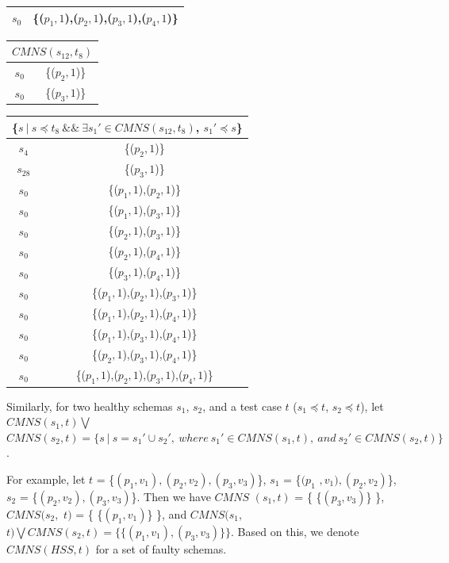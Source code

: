 {\begin{table}[htbp]
\begin{tabular}{|c|c|}
   $s_{0}$ & \{($p_{1}, 1$),($p_{2}, 1$),($p_{3}, 1$),($p_{4}, 1$)\} \\
   \hline
    \end{tabular}%
\quad
    \begin{tabular}{|c|c|} \hline
     \multicolumn{2}{|c|}{$CMNS(s_{12}, t_{8})$} \\ \hline
   $s_{0}$ & \{($p_{2}, 1$)\} \\
   $s_{0}$ & \{($p_{3}, 1$)\} \\
    \hline
    \end{tabular}%
\quad
    \begin{tabular}{|c|c|} \hline
   \multicolumn{2}{|c|}{\{$ s\ |\ s \preceq t_{8}\ \&\& \ \exists s_{1}' \in CMNS(s_{12}, t_{8})$, $s_{1}' \preceq s$\}}\\ \hline
   $s_{4}$ & \{($p_{2}, 1$)\} \\
   $s_{28}$ & \{($p_{3}, 1$)\} \\

   $s_{0}$ & \{($p_{1}, 1$),($p_{2}, 1$)\} \\
   $s_{0}$ & \{($p_{1}, 1$),($p_{3}, 1$)\} \\
   $s_{0}$ & \{($p_{2}, 1$),($p_{3}, 1$)\} \\
   $s_{0}$ & \{($p_{2}, 1$),($p_{4}, 1$)\} \\
   $s_{0}$ & \{($p_{3}, 1$),($p_{4}, 1$)\} \\

   $s_{0}$ & \{($p_{1}, 1$),($p_{2}, 1$),($p_{3}, 1$)\} \\
   $s_{0}$ & \{($p_{1}, 1$),($p_{2}, 1$),($p_{4}, 1$)\} \\
   $s_{0}$ & \{($p_{1}, 1$),($p_{3}, 1$),($p_{4}, 1$)\} \\
   $s_{0}$ & \{($p_{2}, 1$),($p_{3}, 1$),($p_{4}, 1$)\} \\

   $s_{0}$ & \{($p_{1}, 1$),($p_{2}, 1$),($p_{3}, 1$),($p_{4}, 1$)\} \\
   \hline
    \end{tabular}%
\end{table}


Similarly, for two healthy schemas $s_{1}$, $s_{2}$, and a test case $t$ ($s_{1} \preceq t$, $s_{2} \preceq t$), let $CMNS(s_{1}, t) \bigvee $ $CMNS(s_{2}, t)  = \{ s\ |\ s = s_{1}' \cup s_{2}',\ where\ s_{1}' \in CMNS(s_{1}, t),\ and\ s_{2}' \in CMNS(s_{2}, t) \}$.

For example, let $t$ = \{$(p_{1},v_{1}), (p_{2}, v_{2}), (p_{3}, v_{3})$\}, $s_{1}$ = \{$(p_{1}$ $, v_{1}), (p_{2}, v_{2})$\}, $s_{2}$ = \{$(p_{2}, v_{2}), (p_{3}, v_{3})$\}. Then we have $CMNS$ $(s_{1}, t)$ = \{ \{$(p_{3}, v_{3})$\} \}, $CMNS(s_{2},$ $ t)$ = \{ \{$(p_{1}, v_{1})$\} \}, and  $CMNS(s_{1},$ $ t) \bigvee CMNS(s_{2}, t) = \{ \{(p_{1}, v_{1}), (p_{3}, v_{3})\} \} $. Based on this, we denote $CMNS(HSS,t)$ for a set of faulty schemas.


}

